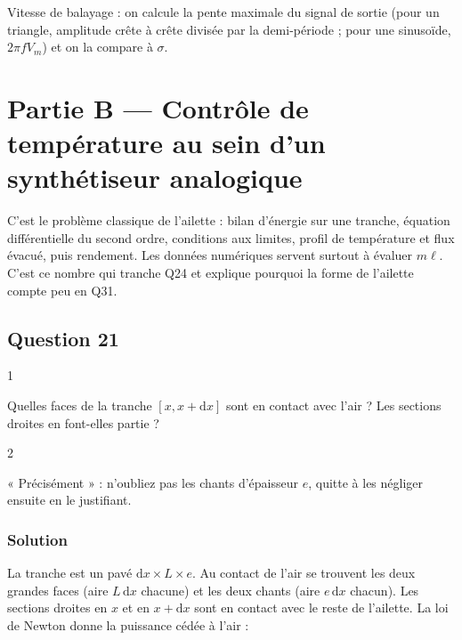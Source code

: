 \documentclass[11pt,a4paper]{article}
\begin{document}
\begin{methode}

Vitesse de balayage : on calcule la pente maximale du signal de sortie (pour un triangle, amplitude crête à crête divisée par la demi-période ; pour une sinusoïde, \(2\pi fV_m\)) et on la compare à \(\sigma\).

\end{methode}

\hypertarget{partie-b-contruxf4le-de-tempuxe9rature-au-sein-dun-synthuxe9tiseur-analogique}{%
\section{Partie B --- Contrôle de température au sein d'un synthétiseur analogique}\label{partie-b-contruxf4le-de-tempuxe9rature-au-sein-dun-synthuxe9tiseur-analogique}}

C'est le problème classique de l'ailette : bilan d'énergie sur une tranche, équation différentielle du second ordre, conditions aux limites, profil de température et flux évacué, puis rendement. Les données numériques servent surtout à évaluer \(m\ell\). C'est ce nombre qui tranche Q24 et explique pourquoi la forme de l'ailette compte peu en Q31.

\hypertarget{question-21}{%
\subsection{Question 21}\label{question-21}}

\begin{indication}{1}

Quelles faces de la tranche \([x,x+\mathrm{d}x]\) sont en contact avec l'air ? Les sections droites en font-elles partie ?

\end{indication}

\begin{indication}{2}

« Précisément » : n'oubliez pas les chants d'épaisseur \(e\), quitte à les négliger ensuite en le justifiant.

\end{indication}

\hypertarget{solution-20}{%
\subsubsection{Solution}\label{solution-20}}

La tranche est un pavé \(\mathrm{d}x\times L\times e\). Au contact de l'air se trouvent les deux grandes faces (aire \(L\,\mathrm{d}x\) chacune) et les deux chants (aire \(e\,\mathrm{d}x\) chacun). Les sections droites en \(x\) et en \(x+\mathrm{d}x\) sont en contact avec le reste de l'ailette. La loi de Newton donne la puissance cédée à l'air :
\end{document}
